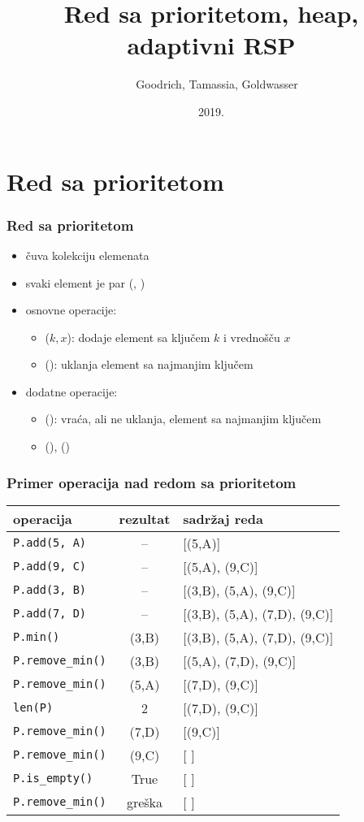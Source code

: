 \documentclass[compress]{beamer}
\title{Red sa prioritetom, heap, adaptivni RSP}
\author{\textcopyright \ \ Goodrich, Tamassia, Goldwasser}
\institute{Katedra za informatiku, Fakultet tehničkih nauka, Univerzitet u
Novom Sadu}
\date{2019.}
\begin{document}
\frame{\titlepage}

\section[Red sa prioritetom]{Red sa prioritetom}
\begin{frame}[fragile]
  \frametitle{Red sa prioritetom}
  \begin{itemize}
    \item {} čuva kolekciju elemenata 
    \item svaki element je par (, )
    \item osnovne operacije:
    \begin{itemize}
      \item {}($k, x$): dodaje element sa ključem $k$ i vrednošču $x$
      \item {}(): uklanja element sa najmanjim ključem 
    \end{itemize}
    \item dodatne operacije:
    \begin{itemize}
      \item {}(): vraća, ali ne uklanja, element sa najmanjim ključem
      \item {}(), () 
    \end{itemize}
  \end{itemize}
\end{frame}

\begin{frame}[fragile,shrink=10]
  \frametitle{Primer operacija nad redom sa prioritetom}
\begin{center}
\begin{tabular}{lcl}
\textbf{operacija} & \textbf{rezultat} & \textbf{sadržaj reda} \\
\hline \hline
\texttt{P.add(5, A)} & -- & [(5,A)] \\ 
\texttt{P.add(9, C)} & -- & [(5,A), (9,C)] \\ 
\texttt{P.add(3, B)} & -- & [(3,B), (5,A), (9,C)] \\ 
\texttt{P.add(7, D)} & -- & [(3,B), (5,A), (7,D), (9,C)] \\ 
\texttt{P.min()} & (3,B) & [(3,B), (5,A), (7,D), (9,C)] \\ 
\texttt{P.remove\_min()} & (3,B) & [(5,A), (7,D), (9,C)] \\ 
\texttt{P.remove\_min()} & (5,A) & [(7,D), (9,C)] \\ 
\texttt{len(P)} & 2 & [(7,D), (9,C)] \\
\texttt{P.remove\_min()} & (7,D) & [(9,C)] \\ 
\texttt{P.remove\_min()} & (9,C) & [ ] \\ 
\texttt{P.is\_empty()} & True & [ ] \\ 
\texttt{P.remove\_min()} & greška & [ ]
\end{tabular}
\end{center}
\end{frame}
\end{document}

